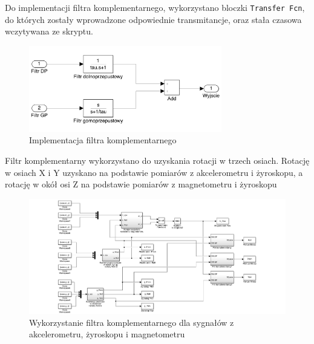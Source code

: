 Do implementacji filtra komplementarnego, wykorzystano bloczki \texttt{Transfer Fcn}, do których zostały wprowadzone odpowiednie transmitancje, oraz stała czasowa wczytywana ze skryptu.
\begin{figure}[h!]
    \centering
    \includegraphics[width=0.75\textwidth]{Rysunki/Rozdzial04/Filtr_komplementarny_implementacja.png}
    \caption{Implementacja filtra komplementarnego}
    \label{Komplementarny implementacja}
\end{figure}

Filtr komplementarny wykorzystano do uzyskania rotacji w trzech osiach. Rotację w osiach X i Y uzyskano na podstawie pomiarów z akcelerometru i żyroskopu, a rotację w okół osi Z na podstawie pomiarów z magnetometru i żyroskopu

\newpage
\begin{figure}[h!]
    \centering
    \includegraphics[width=1\textwidth]{Rysunki/Rozdzial04/Filtr_komplementarny_struktura_png.png}
    \caption{Wykorzystanie filtra komplementarnego dla sygnałów z akcelerometru, żyroskopu i magnetometru}
    \label{Komplementarny struktura}
\end{figure}

